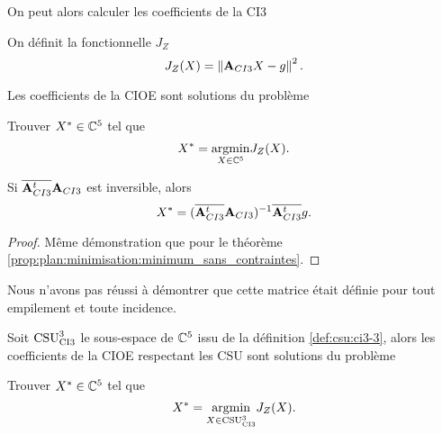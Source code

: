     On peut alors calculer les coefficients de la CI3
    \begin{defn}
      On définit la fonctionnelle \(J_Z\)
      \begin{equation*}
        J_Z(X) = \norm{{\mA}_{CI3}X - {g}}^2.
      \end{equation*}
    \end{defn}
    \begin{thm}

      Les coefficients de la CIOE sont solutions du problème

      Trouver \(X^* \in \CC^5\) tel que
      \begin{equation*}
        X^* = \argmin{X\in \CC^5}  J_Z(X).
      \end{equation*}
    \end{thm}

    \begin{prop}
      \label{prop:sphere:minimisation:minimum_sans_contraintes}
      Si \(\conj{\mA_{CI3}^t}\mA_{CI3}\) est inversible, alors
      \begin{equation*}
        X^* = (\conj{\mA_{CI3}^t}\mA_{CI3})^{-1}\conj{\mA_{CI3}^t}g.
      \end{equation*}
    \end{prop}

    \begin{proof}
      Même démonstration que pour le théorème \ref{prop:plan:minimisation:minimum_sans_contraintes}.
    \end{proof}

    Nous n'avons pas réussi à démontrer que cette matrice était définie pour tout empilement et toute incidence.

    \begin{thm}

      Soit \(\CSU[3]{CI3}\) le sous-espace de \(\CC^5\) issu de la définition \ref{def:csu:ci3-3}, alors les coefficients de la CIOE respectant les CSU sont solutions du problème

      Trouver \(X^* \in \CC^5\) tel que
      \begin{equation*}
        X^* = \argmin{X\in \CSU[3]{CI3}}  J_Z(X).
      \end{equation*}
    \end{thm}

